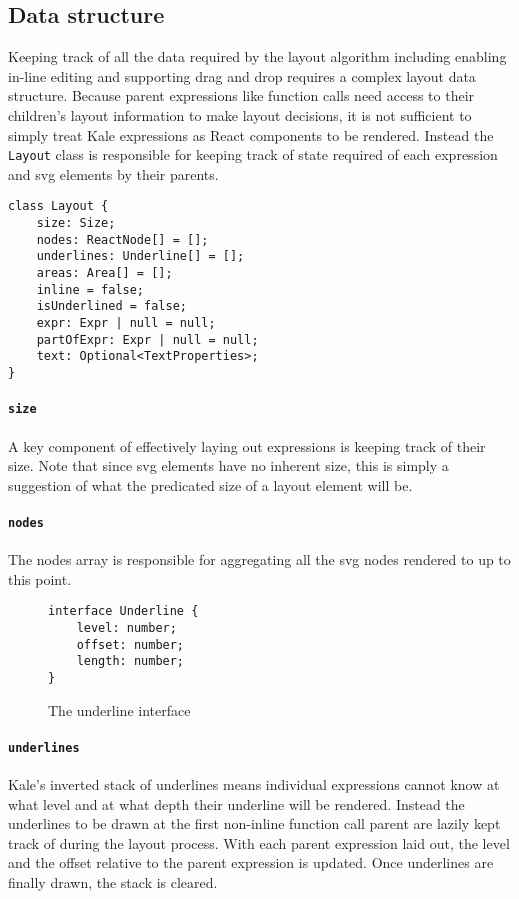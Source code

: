 \subsection{Data structure}

Keeping track of all the data required by the layout algorithm
including enabling in-line editing and supporting drag and drop requires a
complex layout data structure.
Because parent expressions like function calls need access to their children's
layout information to make layout decisions, it is not sufficient to simply
treat Kale expressions as React components to be rendered. Instead the
\texttt{Layout} class is responsible for keeping track of state required
of each expression and \ac{svg} elements by their parents.

\begin{Verbatim}[samepage]
class Layout {
    size: Size;
    nodes: ReactNode[] = [];
    underlines: Underline[] = [];
    areas: Area[] = [];
    inline = false;
    isUnderlined = false;
    expr: Expr | null = null;
    partOfExpr: Expr | null = null;
    text: Optional<TextProperties>;
}
\end{Verbatim}

\newcommand{\field}[1]{
	\paragraph{\texttt{#1}}
	\label{layout:#1}
}
\field{size} A key component of effectively laying out expressions is
keeping track of their size. Note that since \ac{svg} elements have no
inherent size, this is simply a suggestion of what the predicated size
of a layout element will be.

\field{nodes} The nodes array is responsible for aggregating all the
\ac{svg} nodes rendered to up to this point.

\setlength{\columnsep}{5ex}
\begin{wrapfigure}[7]{R}{30ex}
\vspace*{-\baselineskip}
\begin{Verbatim}[samepage]
interface Underline {
    level: number;
    offset: number;
    length: number;
}
\end{Verbatim}
\caption{The underline interface}
\end{wrapfigure}
\field{underlines} Kale's inverted stack of underlines means individual
expressions cannot know at what level and at what depth their underline will
be rendered. Instead the underlines to be drawn at the first non-inline
function call parent are lazily kept track of during the layout process. With
each parent expression laid
out, the level and the offset relative to the parent expression is updated.
Once underlines are finally drawn, the stack is cleared.


